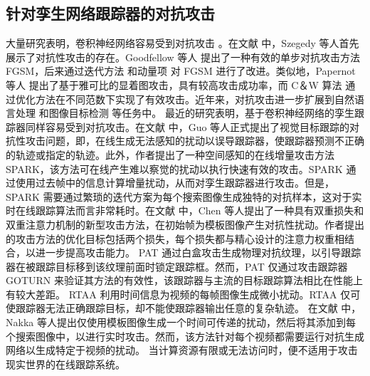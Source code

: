 \subsection{针对孪生网络跟踪器的对抗攻击}
大量研究表明，卷积神经网络容易受到对抗攻击 \cite{Deepsec}。在文献 \cite{intriguing} 中，Szegedy 等人首先展示了对抗性攻击的存在。Goodfellow 等人 \cite{FGSM} 提出了一种有效的单步对抗攻击方法 FGSM，后来通过迭代方法 \cite{kurakin2017adversarial} 和动量项 \cite{dong2018boosting} 对 FGSM 进行了改进。类似地，Papernot 等人 \cite{papernot2016limitations} 提出了基于雅可比的显着图攻击，具有较高攻击成功率，而 C＆W 算法 \cite{carlini2017towards} 通过优化方法在不同范数下实现了有效攻击。近年来，对抗攻击进一步扩展到自然语言处理 \cite{generating} 和图像目标检测 \cite{wei2019transferable} 等任务中。
最近的研究表明，基于卷积神经网络的孪生跟踪器同样容易受到对抗攻击。在文献 \cite{SPARK} 中，Guo 等人正式提出了视觉目标跟踪的对抗性攻击问题，即，在线生成无法感知的扰动以误导跟踪器，使跟踪器预测不正确的轨迹或指定的轨迹。此外，作者提出了一种空间感知的在线增量攻击方法 SPARK，该方法可在线产生难以察觉的扰动以执行快速有效的攻击。SPARK \cite{SPARK} 通过使用过去帧中的信息计算增量扰动，从而对孪生跟踪器进行攻击。但是，SPARK 需要通过繁琐的迭代方案为每个搜索图像生成独特的对抗样本，这对于实时在线跟踪算法而言非常耗时。在文献 \cite{chen2020one} 中，Chen 等人提出了一种具有双重损失和双重注意力机制的新型攻击方法，在初始帧为模板图像产生对抗性扰动。作者提出的攻击方法的优化目标包括两个损失，每个损失都与精心设计的注意力权重相结合，以进一步提高攻击能力。
PAT \cite{PAT} 通过白盒攻击生成物理对抗纹理，以引导跟踪器在被跟踪目标移到该纹理前面时锁定跟踪框。然而，PAT 仅通过攻击跟踪器 GOTURN \cite{GOTURN} 来验证其方法的有效性，该跟踪器与主流的目标跟踪算法相比在性能上有较大差距。
RTAA \cite{RTAA} 利用时间信息为视频的每帧图像生成微小扰动。RTAA 仅可使跟踪器无法正确跟踪目标，却不能使跟踪器输出任意的复杂轨迹。
在文献 \cite{TTP} 中，Nakka 等人提出仅使用模板图像生成一个时间可传递的扰动，然后将其添加到每个搜索图像中，以进行实时攻击。然而，该方法针对每个视频都需要运行对抗生成网络以生成特定于视频的扰动。%
当计算资源有限或无法访问时，便不适用于攻击现实世界的在线跟踪系统。
